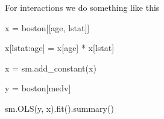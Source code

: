 \documentclass[
  letterpaper,
  DIV=11,
  numbers=noendperiod]{scrreprt}
\newenvironment{Shaded}{\begin{snugshade}}{\end{snugshade}}
\newcommand{\NormalTok}[1]{\textcolor[rgb]{0.00,0.23,0.31}{#1}}
\newcommand{\OperatorTok}[1]{\textcolor[rgb]{0.37,0.37,0.37}{#1}}
\newcommand{\StringTok}[1]{\textcolor[rgb]{0.13,0.47,0.30}{#1}}
\begin{document}
For interactions we do something like this

\begin{Shaded}
\begin{Highlighting}[]
\NormalTok{x }\OperatorTok{=}\NormalTok{ boston[[}\StringTok{\textquotesingle{}age\textquotesingle{}}\NormalTok{, }\StringTok{\textquotesingle{}lstat\textquotesingle{}}\NormalTok{]]}

\NormalTok{x[}\StringTok{\textquotesingle{}lstat:age\textquotesingle{}}\NormalTok{] }\OperatorTok{=}\NormalTok{ x[}\StringTok{\textquotesingle{}age\textquotesingle{}}\NormalTok{] }\OperatorTok{*}\NormalTok{ x[}\StringTok{\textquotesingle{}lstat\textquotesingle{}}\NormalTok{]}

\NormalTok{x }\OperatorTok{=}\NormalTok{ sm.add\_constant(x) }

\NormalTok{y }\OperatorTok{=}\NormalTok{ boston[}\StringTok{\textquotesingle{}medv\textquotesingle{}}\NormalTok{]}


\NormalTok{sm.OLS(y, x).fit().summary()}
\end{Highlighting}
\end{Shaded}
\end{document}

